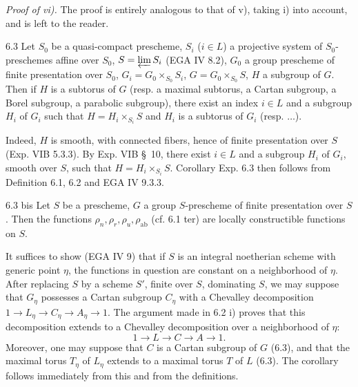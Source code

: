 \par\noindent\emph{Proof of vi).} The proof is entirely analogous to that of v), taking i) into account, and is left to the reader.
\begin{corollary}{6.3}\label{XV.6.3}
Let $S_0$ be a quasi-compact prescheme, $S_i$ ($i\in L$) a projective system of $S_0$-preschemes affine over $S_0$, $S=\varprojlim S_i$ (EGA IV 8.2), $G_0$ a group prescheme of finite presentation over $S_0$, $G_i=G_0\times_{S_0}S_i$, $G=G_0\times_{S_0}S$, $H$ a subgroup of $G$. Then if $H$ is a subtorus of $G$ (resp. a maximal subtorus, a Cartan subgroup, a Borel subgroup, a parabolic subgroup), there exist an index $i\in L$ and a subgroup $H_i$ of $G_i$ such that $H=H_i\times_{S_i}S$ and $H_i$ is a subtorus of $G_i$ (resp. $\ldots$).
\end{corollary}
Indeed, $H$ is smooth, with connected fibers, hence of finite presentation over $S$ (Exp. VIB 5.3.3). By Exp. VIB \S~10, there exist $i\in L$ and a subgroup $H_i$ of $G_i$, smooth over $S$, such that $H=H_i\times_{S_i}S$. Corollary Exp. 6.3 then follows from Definition 6.1, 6.2 and EGA IV 9.3.3.
\begin{corollary}{6.3 bis}\label{XV.6.3bis}
Let $S$ be a prescheme, $G$ a group $S$-prescheme of finite presentation over $S$. Then the functions $\rho_n,\rho_r,\rho_u,\rho_{\mathrm{ab}}$ (cf. 6.1 ter) are locally constructible functions on $S$.
\end{corollary}
It suffices to show (EGA IV 9) that if $S$ is an integral noetherian scheme with generic point $\eta$, the functions in question are constant on a neighborhood of $\eta$. After replacing $S$ by a scheme $S'$, finite over $S$, dominating $S$, we may suppose that $G_\eta$ possesses a Cartan subgroup $C_\eta$ with a Chevalley decomposition $1\to L_\eta\to C_\eta\to A_\eta\to1$. The argument made in 6.2 i) proves that this decomposition extends to a Chevalley decomposition over a neighborhood of $\eta$:
\[
1\to L\to C\to A\to1.
\]
Moreover, one may suppose that $C$ is a Cartan subgroup of $G$ (6.3), and that the maximal torus $T_\eta$ of $L_\eta$ extends to a maximal torus $T$ of $L$ (6.3). The corollary follows immediately from this and from the definitions.

